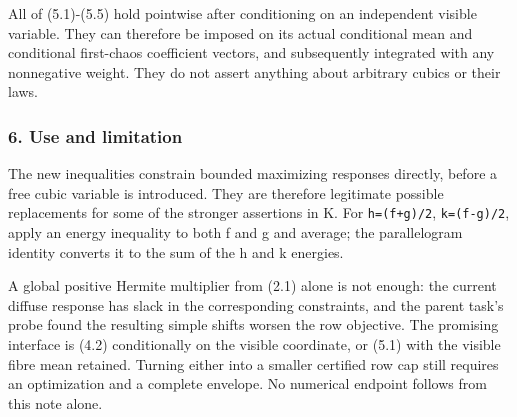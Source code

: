 All of (5.1)-(5.5) hold pointwise after conditioning on an independent
visible variable. They can therefore be imposed on its actual
conditional mean and conditional first-chaos coefficient vectors, and
subsequently integrated with any nonnegative weight. They do not assert
anything about arbitrary cubics or their laws.

\subsubsection{6. Use and limitation}\label{use-and-limitation}

The new inequalities constrain bounded maximizing responses directly,
before a free cubic variable is introduced. They are therefore
legitimate possible replacements for some of the stronger assertions in
K. For \texttt{h=(f+g)/2}, \texttt{k=(f-g)/2}, apply an energy
inequality to both f and g and average; the parallelogram identity
converts it to the sum of the h and k energies.

A global positive Hermite multiplier from (2.1) alone is not enough: the
current diffuse response has slack in the corresponding constraints, and
the parent task's probe found the resulting simple shifts worsen the row
objective. The promising interface is (4.2) conditionally on the visible
coordinate, or (5.1) with the visible fibre mean retained. Turning
either into a smaller certified row cap still requires an optimization
and a complete envelope. No numerical endpoint follows from this note
alone.
